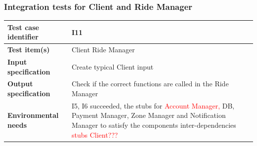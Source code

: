 \documentclass[a4paper,11pt]{report} %
\begin{document}
		\subsubsection{Integration tests for Client and Ride Manager} \label{sec:3.1.8}
			\begin{minipage}{\linewidth}
			\end{minipage}		
		\begin{center}
			\renewcommand{\arraystretch}{1.2}
			\setlength{\tabcolsep}{24pt}
			\begin{tabular}{ l  p{9cm}}\hline
				\textbf{Test case identifier} & I11\\\hline
				\textbf{Test item(s)} & Client \textrightarrow Ride Manager\\\hline
				\textbf{Input specification} & Create typical Client input \\\hline
				\textbf{Output specification} & Check if the correct functions are called in the Ride Manager\\\hline
				\textbf{Environmental needs} &  I5, I6 succeeded, the stubs for \textcolor{red}{Account Manager, }DB, Payment Manager, Zone Manager and Notification Manager to satisfy the components inter-dependencies \textcolor{red}{stubs Client???}\\\hline
			\end{tabular}
		\end{center}
		
		\pagebreak		
\end{document}

